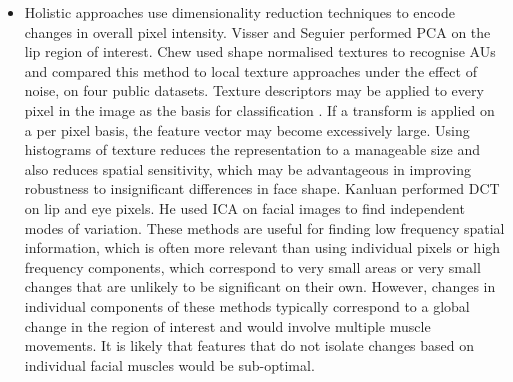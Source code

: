 \begin{itemize}
 \item Holistic approaches use dimensionality reduction techniques to encode changes in overall pixel intensity. Visser \etal \cite{Visser1999} and Seguier \etal \cite{Seguier2002} performed \ac{PCA} on the lip region of interest. Chew \etal \cite{Chew2012} used shape normalised textures to recognise \ac{AU}s and compared this method to local texture approaches under the effect of noise, on four public datasets. Texture descriptors may be applied to every pixel in the image as the basis for classification \cite{Bartlett2006, Moore07}. If a transform is applied on a per pixel basis, the feature vector may become excessively large. Using histograms of texture reduces the representation to a manageable size and also reduces spatial sensitivity, which may be advantageous in improving robustness to insignificant differences in face shape. Kanluan \etal \cite{Kanluan2008} performed \ac{DCT} on lip and eye pixels. He \etal \cite{He2005} used \ac{ICA} on facial images to find independent modes of variation. These methods are useful for finding low frequency spatial information, which is often more relevant than using individual pixels or high frequency components, which correspond to very small areas or very small changes that are unlikely to be significant on their own. However, changes in individual components of these methods typically correspond to a global change in the region of interest and would involve multiple muscle movements. It is likely that features that do not isolate changes based on individual facial muscles would be sub-optimal. %


\end{itemize}
